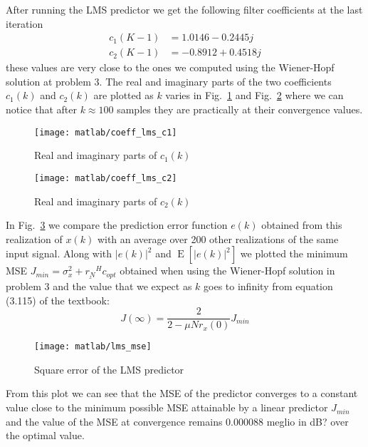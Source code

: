 \documentclass{article}
\renewcommand{\vec}[1]{\underline{#1}}
\newcommand{\E}[1]{\operatorname{E}\left[#1\right]}
\newcommand{\abs}[1]{\left|#1\right|}
\begin{document}
  After running the LMS predictor we get the following filter
  coefficients at the last iteration
\begin{align*}
  c_1(K-1) &= 1.0146 - 0.2445j   \\
  c_2(K-1) &= -0.8912 + 0.4518j
\end{align*}
{\color{red} these values are very close} to the ones we computed
using the Wiener-Hopf solution at problem 3. The real and imaginary
parts of the two coefficients $c_1(k)$ and $c_2(k)$ are plotted as $k$
varies in Fig.~\ref{plot:coeff_lms_c1} and
Fig.~\ref{plot:coeff_lms_c2} where we can notice that after $k \approx 100$
samples they are practically at their convergence values.
\begin{figure}[htbp]
  \centering
  \texttt{[image: matlab/coeff\_lms\_c1]}
  \caption{Real and imaginary parts of $c_1(k)$}
  \label{plot:coeff_lms_c1}
\end{figure}
\begin{figure}[htbp]
  \centering
  \texttt{[image: matlab/coeff\_lms\_c2]}
  \caption{Real and imaginary parts of $c_2(k)$}
  \label{plot:coeff_lms_c2}
\end{figure}

In Fig.~\ref{plot:lms_mse} we compare the prediction error function
$e(k)$ obtained from this realization of $x(k)$ with an average over
200 other realizations of the same input signal.  Along with
$\abs{e(k)}^2$ and $\E{ \abs{e(k)}^2 }$ we plotted the minimum MSE
$J_{min} = \sigma^2_x + \vec{r_N}^Hc_{opt}$ obtained when using the
Wiener-Hopf solution in problem 3 and the value that we expect as $k$
goes to infinity from equation (3.115) of the textbook:
\[ J(\infty) = \frac{2}{2-\mu N r_x(0)}J_{min} \]
\begin{figure}[htbp]
  \centering
  \texttt{[image: matlab/lms\_mse]}
  \caption{Square error of the LMS predictor}
  \label{plot:lms_mse}
\end{figure}
From this plot we can see that the MSE of the predictor converges to a
constant value close to {\color{red} the minimum possible MSE
  attainable by a linear predictor $J_{min}$} and the value of the MSE
at convergence remains 0.000088 {\color{red} meglio in dB?} over the
optimal value.
\end{document}
